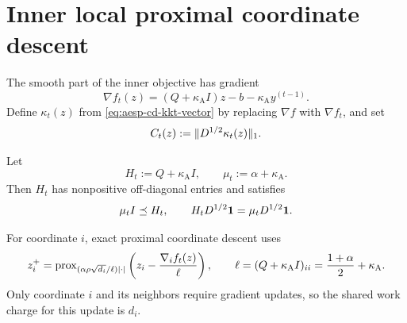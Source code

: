 \section{Inner local proximal coordinate descent}

The smooth part of the inner objective has gradient
\begin{equation}
  \nabla f_t(z)
  =(Q+\kappa_{\mathrm A}I)z-b
    -\kappa_{\mathrm A}y^{(t-1)}.
  \label{eq:aesp-cd-inner-gradient}
\end{equation}
Define $\kappa_t(z)$ from \cref{eq:aesp-cd-kkt-vector} by replacing
$\nabla f$ with $\nabla f_t$, and set
\begin{equation}
  C_t(z):=\lVert D^{1/2}\kappa_t(z)\rVert_1.
  \label{eq:aesp-cd-kkt-mass}
\end{equation}

Let
\begin{equation}
  H_t:=Q+\kappa_{\mathrm A}I,
  \qquad
  \mu_t:=\alpha+\kappa_{\mathrm A}.
  \label{eq:aesp-cd-shifted-hessian}
\end{equation}
Then $H_t$ has nonpositive off-diagonal entries and satisfies
\begin{equation}
  \mu_t I\preceq H_t,
  \qquad
  H_tD^{1/2}\mathbf{1}=\mu_tD^{1/2}\mathbf{1}.
  \label{eq:aesp-cd-shifted-properties}
\end{equation}

For coordinate $i$, exact proximal coordinate descent uses
\begin{equation}
  z_i^+
  =\operatorname{prox}_{(\alpha\rho\sqrt{d_i}/\ell)\left\lvert \cdot \right\rvert}
     \left(z_i-\frac{\nabla_i f_t(z)}{\ell}\right),
  \qquad
  \ell=(Q+\kappa_{\mathrm A}I)_{ii}
      =\frac{1+\alpha}{2}+\kappa_{\mathrm A}.
  \label{eq:aesp-cd-coordinate-update}
\end{equation}
Only coordinate $i$ and its neighbors require gradient updates, so the shared
work charge for this update is $d_i$.

